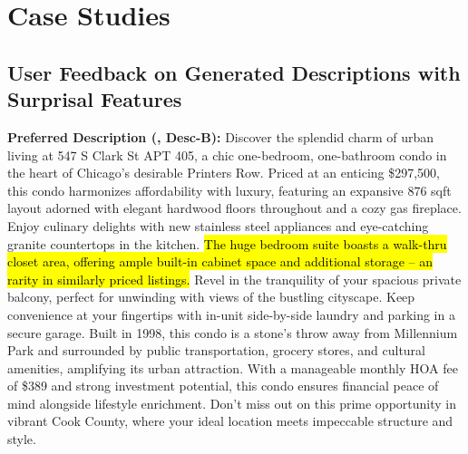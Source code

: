  

\section{Case Studies}
\label{sec: case-studies-all}
\subsection{User Feedback on Generated Descriptions with Surprisal Features}
\label{sec: case-for-surprisal}

\begin{center}
\begin{tcolorbox}[colback=white,colframe=gray!20,width=0.95\textwidth]
{\footnotesize \textbf{Preferred Description (\agentname, Desc-B):} Discover the splendid charm of urban living at 547 S Clark St APT 405, a chic one-bedroom, one-bathroom condo in the heart of Chicago's desirable Printers Row. Priced at an enticing \$297,500, this condo harmonizes affordability with luxury, featuring an expansive 876 sqft layout adorned with elegant hardwood floors throughout and a cozy gas fireplace. Enjoy culinary delights with new stainless steel appliances and eye-catching granite countertops in the kitchen. \hl{The huge bedroom suite boasts a walk-thru closet area, offering ample built-in cabinet space and additional storage --  an rarity in similarly priced listings.} Revel in the tranquility of your spacious private balcony, perfect for unwinding with views of the bustling cityscape. Keep convenience at your fingertips with in-unit side-by-side laundry and parking in a secure garage. Built in 1998, this condo is a stone's throw away from Millennium Park and surrounded by public transportation, grocery stores, and cultural amenities, amplifying its urban attraction. With a manageable monthly HOA fee of \$389 and strong investment potential, this condo ensures financial peace of mind alongside lifestyle enrichment. Don't miss out on this prime opportunity in vibrant Cook County, where your ideal location meets impeccable structure and style.}
\vspace{0.2em}


\end{tcolorbox}
\end{center}
